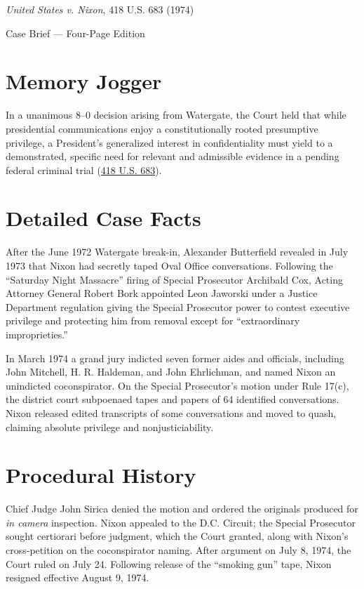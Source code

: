 \documentclass[12pt]{article}
\begin{document}
\begin{center}
{\LARGE \textit{United States v. Nixon}, 418 U.S. 683 (1974)\par}
\vspace{0.8em}
{\large Case Brief --- Four-Page Edition\par}
\end{center}
\vspace{1em}

\section{Memory Jogger}

In a unanimous 8--0 decision arising from Watergate, the Court held that while presidential communications enjoy a constitutionally rooted presumptive privilege, a President's generalized interest in confidentiality must yield to a demonstrated, specific need for relevant and admissible evidence in a pending federal criminal trial (\href{https://supreme.justia.com/cases/federal/us/418/683/}{418 U.S. 683}).

\section{Detailed Case Facts}

After the June 1972 Watergate break-in, Alexander Butterfield revealed in July 1973 that Nixon had secretly taped Oval Office conversations. Following the ``Saturday Night Massacre'' firing of Special Prosecutor Archibald Cox, Acting Attorney General Robert Bork appointed Leon Jaworski under a Justice Department regulation giving the Special Prosecutor power to contest executive privilege and protecting him from removal except for ``extraordinary improprieties.''

In March 1974 a grand jury indicted seven former aides and officials, including John Mitchell, H. R. Haldeman, and John Ehrlichman, and named Nixon an unindicted coconspirator. On the Special Prosecutor's motion under Rule 17(c), the district court subpoenaed tapes and papers of 64 identified conversations. Nixon released edited transcripts of some conversations and moved to quash, claiming absolute privilege and nonjusticiability.

\section{Procedural History}

Chief Judge John Sirica denied the motion and ordered the originals produced for \textit{in camera} inspection. Nixon appealed to the D.C. Circuit; the Special Prosecutor sought certiorari before judgment, which the Court granted, along with Nixon's cross-petition on the coconspirator naming. After argument on July 8, 1974, the Court ruled on July 24. Following release of the ``smoking gun'' tape, Nixon resigned effective August 9, 1974.
\end{document}
